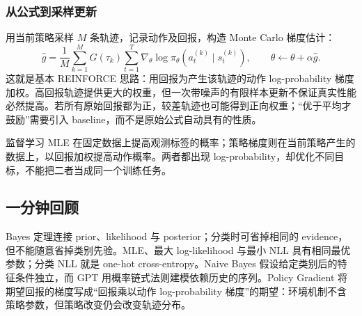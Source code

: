 \subsubsection*{从公式到采样更新}

用当前策略采样 $M$ 条轨迹，记录动作及回报，构造 Monte Carlo 梯度估计：
\[
  \hat g=\frac1M\sum_{k=1}^{M}G(\tau_k)
       \sum_{t=1}^{T}\nabla_\theta
       \log\pi_\theta(a_t^{(k)}\mid s_t^{(k)}),
  \qquad \theta\leftarrow\theta+\alpha\hat g.
\]
这就是基本 REINFORCE 思路：用回报为产生该轨迹的动作 log-probability 梯度加权。高回报轨迹提供更大的权重，但一次带噪声的有限样本更新不保证真实性能必然提高。若所有原始回报都为正，较差轨迹也可能得到正向权重；“优于平均才鼓励”需要引入 baseline，而不是原始公式自动具有的性质。

监督学习 MLE 在固定数据上提高观测标签的概率；策略梯度则在当前策略产生的数据上，以回报加权提高动作概率。两者都出现 log-probability，却优化不同目标，不能把二者当成同一个训练任务。

\subsection{一分钟回顾}

Bayes 定理连接 prior、likelihood 与 posterior；分类时可省掉相同的 evidence，但不能随意省掉类别先验。MLE、最大 log-likelihood 与最小 NLL 具有相同最优参数；分类 NLL 就是 one-hot cross-entropy。Naive Bayes 假设给定类别后的特征条件独立，而 GPT 用概率链式法则建模依赖历史的序列。Policy Gradient 将期望回报的梯度写成“回报乘以动作 log-probability 梯度”的期望：环境机制不含策略参数，但策略改变仍会改变轨迹分布。

